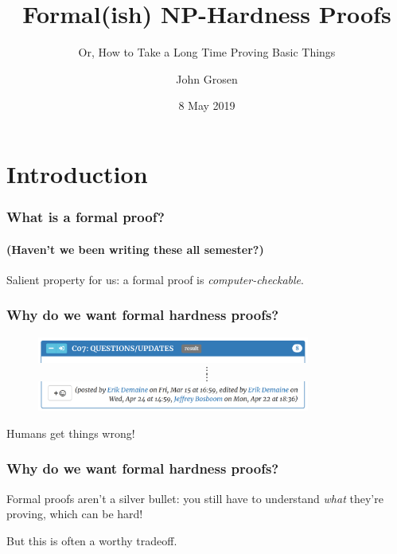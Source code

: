 \documentclass{beamer}
\title{Formal(ish) NP-Hardness Proofs}
\subtitle{Or, How to Take a Long Time Proving Basic Things}
\author{John Grosen}
\date{8 May 2019}
\begin{document}
\begin{frame}
  \titlepage
\end{frame}

\section{Introduction}

\begin{frame}
  \frametitle{What is a formal proof?}
  \framesubtitle{(Haven't we been writing these all semester?)}

  Salient property for us:
  \pause
  a formal proof is \emph{computer-checkable}.
\end{frame}

\begin{frame}
  \frametitle{Why do we want formal hardness proofs?}

  \vspace{-2ex}

  \begin{figure}
    \includegraphics[width=0.8\textwidth]{bug1header}
    $$\vdots$$
    $$\vdots$$
    \includegraphics[width=0.8\textwidth]{bug1footer}
  \end{figure}

  \pause
  \pause
  \centering
  Humans get things wrong!

\end{frame}

\begin{frame}
  \frametitle{Why do we want formal hardness proofs?}

  Formal proofs aren't a silver bullet: you still have to understand \emph{what}
  they're proving, which can be hard!

  \vspace{5ex}

  But this is often a worthy tradeoff.
\end{frame}
\end{document}

